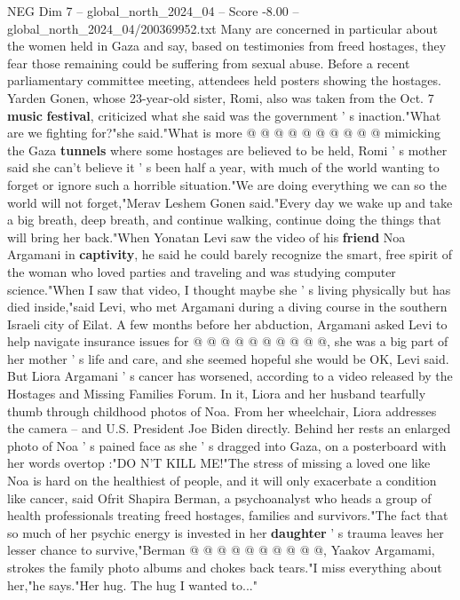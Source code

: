 \begin{textsample}{NEG Dim 7 – global\_north\_2024\_04 – Score -8.00 – global\_north\_2024\_04/200369952.txt}
Many are concerned in particular about the women held in Gaza and say, based on testimonies from freed hostages, they fear those remaining could be suffering from sexual abuse.
Before a recent parliamentary committee meeting, attendees held posters showing the hostages.
Yarden Gonen, whose 23-year-old sister, Romi, also was taken from the Oct. 7 \textbf{music} \textbf{festival}, criticized what she said was the government ' s inaction."What are we fighting for?"she said."What is more @ @ @ @ @ @ @ @ @ @ mimicking the Gaza \textbf{tunnels} where some hostages are believed to be held, Romi ' s mother said she can't believe it ' s been half a year, with much of the world wanting to forget or ignore such a horrible situation."We are doing everything we can so the world will not forget,"Merav Leshem Gonen said."Every day we wake up and take a big breath, deep breath, and continue walking, continue doing the things that will bring her back."When Yonatan Levi saw the video of his \textbf{friend} Noa Argamani in \textbf{captivity}, he said he could barely recognize the smart, free spirit of the woman who loved parties and traveling and was studying computer science."When I saw that video, I thought maybe she ' s living physically but has died inside,"said Levi, who met Argamani during a diving course in the southern Israeli city of Eilat.
A few months before her abduction, Argamani asked Levi to help navigate insurance issues for @ @ @ @ @ @ @ @ @ @, she was a big part of her mother ' s life and care, and she seemed hopeful she would be OK, Levi said.
But Liora Argamani ' s cancer has worsened, according to a video released by the Hostages and Missing Families Forum.
In it, Liora and her husband tearfully thumb through childhood photos of Noa.
From her wheelchair, Liora addresses the camera -- and U.S.
President Joe Biden directly.
Behind her rests an enlarged photo of Noa ' s pained face as she ' s dragged into Gaza, on a posterboard with her words overtop :"DO N'T KILL ME!"The stress of missing a loved one like Noa is hard on the healthiest of people, and it will only exacerbate a condition like cancer, said Ofrit Shapira Berman, a psychoanalyst who heads a group of health professionals treating freed hostages, families and survivors."The fact that so much of her psychic energy is invested in her \textbf{daughter} ' s trauma leaves her lesser chance to survive,"Berman @ @ @ @ @ @ @ @ @ @, Yaakov Argamami, strokes the family photo albums and chokes back tears."I miss everything about her,"he says."Her hug.
The hug I wanted to..."

\end{textsample}
